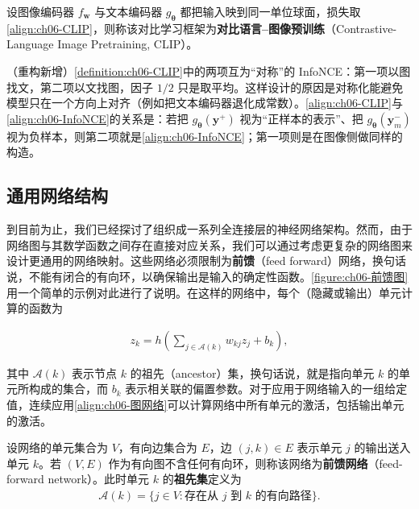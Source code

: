 \documentclass[../../main.tex]{subfiles}
\begin{document}
\begin{definition}[CLIP]\label{definition:ch06-CLIP}
设图像编码器 $f_{\boldsymbol{w}}$ 与文本编码器 $g_{\boldsymbol{\theta}}$ 都把输入映到同一单位球面，损失取\eqref{align:ch06-CLIP}，则称该对比学习框架为\textbf{对比语言--图像预训练}（Contrastive-Language Image Pretraining, CLIP）。
\end{definition}

\begin{remark}（重构新增）\cref{definition:ch06-CLIP}中的两项互为“对称”的 InfoNCE：第一项以图找文，第二项以文找图，因子 $1/2$ 只是取平均。这样设计的原因是对称化能避免模型只在一个方向上对齐（例如把文本编码器退化成常数）。\eqref{align:ch06-CLIP}与\eqref{align:ch06-InfoNCE}的关系是：若把 $g_{\boldsymbol{\theta}}(\boldsymbol{y}^{+})$ 视为“正样本的表示”、把 $g_{\boldsymbol{\theta}}(\boldsymbol{y}_m^{-})$ 视为负样本，则第二项就是\eqref{align:ch06-InfoNCE}；第一项则是在图像侧做同样的构造。
\end{remark}

\subsection{通用网络结构}\label{subsection:ch06-通用网络结构}

到目前为止，我们已经探讨了组织成一系列全连接层的神经网络架构。然而，由于网络图与其数学函数之间存在直接对应关系，我们可以通过考虑更复杂的网络图来设计更通用的网络映射。这些网络必须限制为\textbf{前馈}（feed forward）网络，换句话说，不能有闭合的有向环，以确保输出是输入的确定性函数。\cref{figure:ch06-前馈图}用一个简单的示例对此进行了说明。在这样的网络中，每个（隐藏或输出）单元计算的函数为

\begin{align}
z_k=h\!\left(\sum_{j\in\mathcal{A}(k)}w_{kj}z_j+b_k\right),
\label{align:ch06-图网络}
\end{align}

其中 $\mathcal{A}(k)$ 表示节点 $k$ 的祖先（ancestor）集，换句话说，就是指向单元 $k$ 的单元所构成的集合，而 $b_k$ 表示相关联的偏置参数。对于应用于网络输入的一组给定值，连续应用\eqref{align:ch06-图网络}可以计算网络中所有单元的激活，包括输出单元的激活。

\begin{definition}[前馈网络]\label{definition:ch06-前馈网络}
设网络的单元集合为 $V$，有向边集合为 $E$，边 $(j,k)\in E$ 表示单元 $j$ 的输出送入单元 $k$。若 $(V,E)$ 作为有向图不含任何有向环，则称该网络为\textbf{前馈网络}（feed-forward network）。此时单元 $k$ 的\textbf{祖先集}定义为
\begin{align}
\mathcal{A}(k)=\bigl\{j\in V:\text{存在从 }j\text{ 到 }k\text{ 的有向路径}\bigr\}.
\label{align:ch06-祖先集}
\end{align}
\end{definition}
\end{document}
